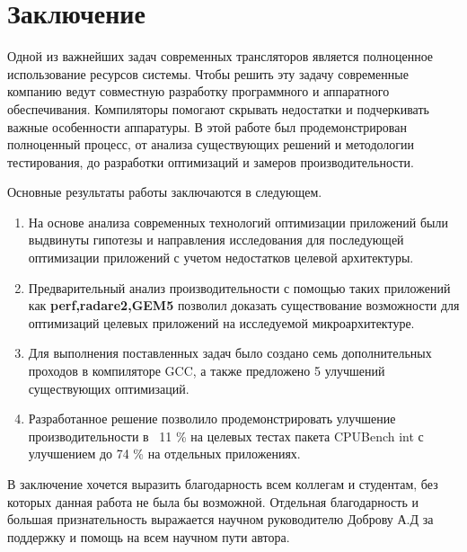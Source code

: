 \chapter*{Заключение}                       %

Одной из важнейших задач современных трансляторов является полноценное использование ресурсов системы. Чтобы решить эту задачу современные компанию ведут совместную разработку программного и аппаратного обеспечивания. Компиляторы помогают скрывать недостатки и подчеркивать важные особенности аппаратуры. В этой работе был продемонстрирован полноценный процесс, от анализа существующих решений и методологии тестирования, до разработки оптимизаций и замеров производительности. 

Основные результаты работы заключаются в следующем.
\begin{enumerate}
	\item На основе анализа современных технологий оптимизации приложений были выдвинуты гипотезы и направления исследования для последующей оптимизации приложений с учетом недостатков целевой архитектуры.
	\item Предварительный анализ производительности с помощью таких приложений как \textbf{perf,radare2,GEM5} позволил доказать существование возможности  для оптимизаций целевых приложений на исследуемой микроархитектуре. 
	\item Для выполнения поставленных задач было создано семь дополнительных проходов в компиляторе GCC, а также предложено 5 улучшений существующих оптимизаций.
	\item Разработанное решение позволило продемонстрировать улучшение производительности в ~11 \% на целевых тестах пакета CPUBench int  с улучшением до 74 \% на отдельных приложениях. 
\end{enumerate}

В заключение хочется выразить благодарность всем коллегам и студентам, без которых данная работа не была бы возможной. Отдельная благодарность и большая признательность выражается научном руководителю Доброву А.Д за поддержку и помощь на всем научном пути автора.
